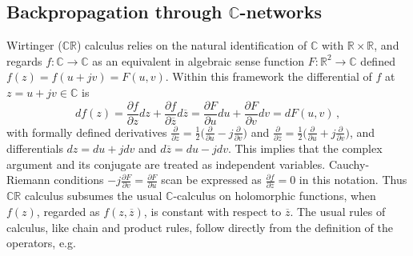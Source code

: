 \documentclass[a4paper,10pt]{article}
\newcommand{\real}{\mathbb{R}}
\newcommand{\cplx}{\mathbb{C}}
\newcommand{\conj}[1]{\overline{#1}}
\begin{document}

\subsection{Backpropagation through $\cplx$-networks} %
\label{sub:wirtinger_calculus}

Wirtinger ($\cplx\real$) calculus relies on the natural identification of $\cplx$ with $
  \real \times \real
$, and regards $
  f\colon \cplx \to \cplx
$ as an equivalent in algebraic sense function $F\colon \real^2 \to \cplx$ defined $
  f(z) = f(u + jv) = F(u, v)
$. Within this framework the differential of $f$ at $z = u + jv \in \cplx$ is
$$
df(z)
  = \frac{\partial f}{\partial z} dz
    + \frac{\partial f}{\partial \conj{z}} d\conj{z}
   = \frac{\partial F}{\partial u} du
     + \frac{\partial F}{\partial v} dv
   = dF(u, v)
  \,, $$
with formally defined derivatives $
  \tfrac{\partial}{\partial z}
    = \tfrac12 \bigl(
      \tfrac{\partial}{\partial u}
      - j \tfrac{\partial}{\partial v}
    \bigr)
$ and $
  \tfrac{\partial}{\partial \conj{z}}
    = \tfrac12 \bigl(
      \tfrac{\partial}{\partial u}
      + j \tfrac{\partial}{\partial v}
    \bigr)
$, and differentials $dz = du + j dv$ and $d\conj{z} = du - j dv$. This implies that the
complex argument and its conjugate are treated as independent variables. Cauchy-Riemann
conditions $
  -j \tfrac{\partial F}{\partial v} = \tfrac{\partial F}{\partial u}
$ scan be expressed as $
  \tfrac{\partial f}{\partial \conj{z}} = 0
$ in this notation. Thus $\cplx\real$ calculus subsumes the usual $\cplx$-calculus on
holomorphic functions, when $f(z)$, regarded as $f(z, \conj{z})$, is constant with respect
to $\conj{z}$. The usual rules of calculus, like chain and product rules, follow directly
from the definition of the operators, e.g.
\end{document}

